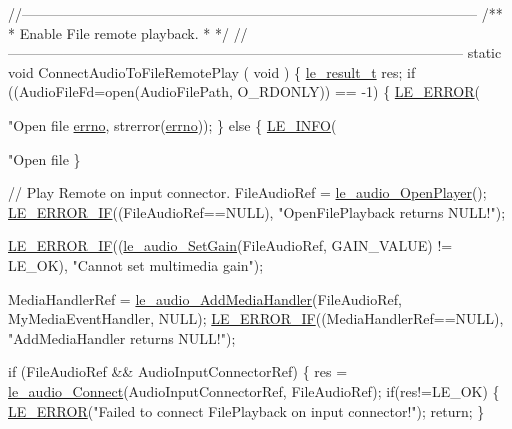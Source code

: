 \begin{DoxyCodeInclude}
{\textcolor{comment}{//--------------------------------------------------------------------------------------------------}\textcolor{comment}{}
\textcolor{comment}{/**}
\textcolor{comment}{ * Enable File remote playback.}
\textcolor{comment}{ *}
\textcolor{comment}{ */}
\textcolor{comment}{//--------------------------------------------------------------------------------------------------}
\textcolor{keyword}{static} \textcolor{keywordtype}{void} ConnectAudioToFileRemotePlay
(
    \textcolor{keywordtype}{void}
)
\{
    \hyperlink{le__basics_8h_a1cca095ed6ebab24b57a636382a6c86c}{le\_result\_t} res;
    \textcolor{keywordflow}{if} ((AudioFileFd=open(AudioFilePath, O\_RDONLY)) == -1)
    \{
        \hyperlink{le__log_8h_a353590f91b3143a7ba3a416ae5a50c3d}{LE\_ERROR}(\textcolor{stringliteral}{"Open file %
      \hyperlink{supervisor_8c_a0a4ccfdbe1cf7b37afc60d34e748b066}{errno}, strerror(\hyperlink{supervisor_8c_a0a4ccfdbe1cf7b37afc60d34e748b066}{errno}));
    \}
    \textcolor{keywordflow}{else}
    \{
        \hyperlink{le__log_8h_a23e6d206faa64f612045d688cdde5808}{LE\_INFO}(\textcolor{stringliteral}{"Open file %
    \}

    \textcolor{comment}{// Play Remote on input connector.}
    FileAudioRef = \hyperlink{le__audio__interface_8h_a92eb1b6377f50ff07b97c5b8546f01ec}{le\_audio\_OpenPlayer}();
    \hyperlink{le__log_8h_aceaf11a11691d6c676e36dd317b38dbd}{LE\_ERROR\_IF}((FileAudioRef==NULL), \textcolor{stringliteral}{"OpenFilePlayback returns NULL!"});

    \hyperlink{le__log_8h_aceaf11a11691d6c676e36dd317b38dbd}{LE\_ERROR\_IF}((\hyperlink{le__audio__interface_8h_a65f11540e6af03a3494b6b9be76ba5fc}{le\_audio\_SetGain}(FileAudioRef, GAIN\_VALUE) != LE\_OK), \textcolor{stringliteral}{"Cannot
       set multimedia gain"});

    MediaHandlerRef = \hyperlink{le__audio__interface_8h_a9996ac9d23333cf8219f28b69cac4f81}{le\_audio\_AddMediaHandler}(FileAudioRef, MyMediaEventHandler, 
      NULL);
    \hyperlink{le__log_8h_aceaf11a11691d6c676e36dd317b38dbd}{LE\_ERROR\_IF}((MediaHandlerRef==NULL), \textcolor{stringliteral}{"AddMediaHandler returns NULL!"});

    \textcolor{keywordflow}{if} (FileAudioRef && AudioInputConnectorRef)
    \{
        res = \hyperlink{le__audio__interface_8h_a338df65b2fb1ae0140d86880adbcf0de}{le\_audio\_Connect}(AudioInputConnectorRef, FileAudioRef);
        \textcolor{keywordflow}{if}(res!=LE\_OK)
        \{
            \hyperlink{le__log_8h_a353590f91b3143a7ba3a416ae5a50c3d}{LE\_ERROR}(\textcolor{stringliteral}{"Failed to connect FilePlayback on input connector!"});
            \textcolor{keywordflow}{return};
        \}

}}}
\end{DoxyCodeInclude}
